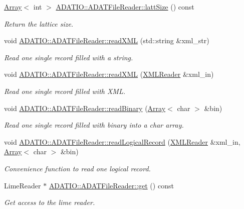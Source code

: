 \begin{DoxyCompactItemize}
\mbox{\hyperlink{classXMLArray_1_1Array}{Array}}$<$ int $>$ \mbox{\hyperlink{group__qio_ga3498ab9948d446056dee8f2808e05c78}{A\+D\+A\+T\+I\+O\+::\+A\+D\+A\+T\+File\+Reader\+::latt\+Size}} () const
\begin{DoxyCompactList}\small\item\em Return the lattice size. \end{DoxyCompactList}\item 
void \mbox{\hyperlink{group__qio_gae57feac2bf53666ac092bb0a43125226}{A\+D\+A\+T\+I\+O\+::\+A\+D\+A\+T\+File\+Reader\+::read\+X\+ML}} (std\+::string \&xml\+\_\+str)
\begin{DoxyCompactList}\small\item\em Read one single record filled with a string. \end{DoxyCompactList}\item 
void \mbox{\hyperlink{group__qio_ga9a1ac411577bd50e643f483119318893}{A\+D\+A\+T\+I\+O\+::\+A\+D\+A\+T\+File\+Reader\+::read\+X\+ML}} (\mbox{\hyperlink{classADATXML_1_1XMLReader}{X\+M\+L\+Reader}} \&xml\+\_\+in)
\begin{DoxyCompactList}\small\item\em Read one single record filled with X\+ML. \end{DoxyCompactList}\item 
void \mbox{\hyperlink{group__qio_ga40b41bda2b27ce68a0ac0ee28124fc64}{A\+D\+A\+T\+I\+O\+::\+A\+D\+A\+T\+File\+Reader\+::read\+Binary}} (\mbox{\hyperlink{classXMLArray_1_1Array}{Array}}$<$ char $>$ \&bin)
\begin{DoxyCompactList}\small\item\em Read one single record filled with binary into a char array. \end{DoxyCompactList}\item 
void \mbox{\hyperlink{group__qio_ga7d36d6dd7fef90986d0c435ddaa86eae}{A\+D\+A\+T\+I\+O\+::\+A\+D\+A\+T\+File\+Reader\+::read\+Logical\+Record}} (\mbox{\hyperlink{classADATXML_1_1XMLReader}{X\+M\+L\+Reader}} \&xml\+\_\+in, \mbox{\hyperlink{classXMLArray_1_1Array}{Array}}$<$ char $>$ \&bin)
\begin{DoxyCompactList}\small\item\em Convenience function to read one logical record. \end{DoxyCompactList}\item 
Lime\+Reader $\ast$ \mbox{\hyperlink{group__qio_ga40c1ee10fe351724bdfc91f4fd655328}{A\+D\+A\+T\+I\+O\+::\+A\+D\+A\+T\+File\+Reader\+::get}} () const
\begin{DoxyCompactList}\small\item\em Get access to the lime reader. \end{DoxyCompactList}\item 

\end{DoxyCompactItemize}
